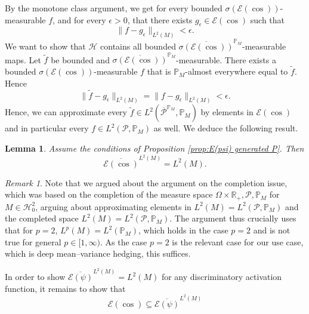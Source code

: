 \documentclass[11pt,a4paper,twoside,openany]{report}
\numberwithin{equation}{section}
\theoremstyle{plain} %
\newtheorem{lemma}[theorem]{Lemma}
\theoremstyle{definition} %
\theoremstyle{remark} %
\newtheorem{remark}[theorem]{Remark}
\begin{document}
By the monotone class argument, we get for every bounded \(\sigma(\mathcal{E}(\cos))\)-measurable \(f\), and for every \(\epsilon>0\), that there exists \(g_{\epsilon}\in \mathcal{E}(\cos)\) such that 
 \begin{equation*}
     \lVert f-g_{\epsilon}\rVert_{L^2(M)}<\epsilon.
 \end{equation*}
 We want to show that \(\mathcal{H}\) contains all bounded \(\overline{\sigma(\mathcal{E}(\cos))}^{\mathbb{P}_M}\)-measurable maps. Let \(\widetilde{f}\) be bounded and \(\overline{\sigma(\mathcal{E}(\cos))}^{\mathbb{P}_M}\)-measurable. There exists a bounded \(\sigma(\mathcal{E}(\cos))\)-measurable \(f\) that is \(\mathbb{P}_M\)-almost everywhere equal to \(\widetilde{f}\). Hence 
 \begin{equation*}
     \lVert \widetilde{f}-g_{\epsilon}\rVert_{L^2(M)}=\lVert f-g_{\epsilon}\rVert_{L^2(M)}<\epsilon.
 \end{equation*}
 Hence, we can approximate every \(\widetilde{f}\in L^2(\overline{\mathcal{P}}^{\mathbb{P}_M},\mathbb{P}_M)\) by elements in \(\mathcal{E}(\cos)\) and in particular every \(f\in L^2(\mathcal{P},\mathbb{P}_M)\) as well. We deduce the following result.
\begin{lemma}\label{lemma:density of E(cos) in L2(M)}
Assume the conditions of Proposition \ref{prop:E(psi) generated P}. Then 
\begin{equation*}
    \overline{\mathcal{E}(\cos)}^{L^2(M)}=L^2(M).
\end{equation*}
\end{lemma}
\begin{remark}
    Note that we argued about the argument on the completion issue, which was based on the completion of the measure space \(\Omega\times\mathbb{R}_+,\mathcal{P},\mathbb{P}_M\) for \(M\in\mathcal{H}^2_0\), arguing about approximating elements in \(L^2(M)=L^2(\mathcal{P},\mathbb{P}_M)\) and the completed space \(L^2(M)=L^2(\mathcal{P},\mathbb{P}_M)\).
    The argument thus crucially uses that for \(p=2\), \(L^p(M)=L^2(\mathbb{P}_M)\), which holds in the case \(p=2\) and is not true for general \(p\in [1,\infty)\). As the case \(p=2\) is the relevant case for our use case, which is deep mean--variance hedging, this suffices.
\end{remark}
In order to show \(\overline{\mathcal{E}(\psi)}^{L^2(M)}=L^2(M)\) for any discriminatory activation function, it remains to show that
\begin{equation*}
    \mathcal{E}(\cos)\subseteq \overline{\mathcal{E}(\psi)}^{L^2(M)}
\end{equation*}
\end{document}

